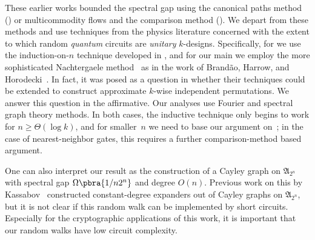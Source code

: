 These earlier works bounded the spectral gap using the canonical paths method (\cite{gowers1996almost,hoory2005simple}) or multicommodity flows and the comparison method (\cite{brodsky2008simple}). We depart from these methods and use techniques from the physics literature concerned with the extent to which random \emph{quantum} circuits are \emph{unitary} $k$-designs. Specifically, for  we use the  induction-on-$n$ technique developed in \cite{haferkamp2021improved}, and for our main  we employ the more sophisticated Nachtergaele method~\cite{nachtergaele1996spectral} as in the work of Brand\~{a}o, Harrow, and Horodecki~\cite{brandao2016local}. In fact, it was posed as a question in \cite{brandao2016local} whether their techniques could be extended to construct approximate $k$-wise independent permutations. We answer this question in the affirmative. Our analyses use Fourier and spectral graph theory methods. In both cases, the inductive technique only begins to work for $n \geq \Theta(\log k)$, and for smaller~$n$ we need to base our argument on~\cite{brodsky2008simple}; in the case of nearest-neighbor gates, this requires a further comparison-method based argument.

One can also interpret our result as the construction of a Cayley graph on $\mathfrak{A}_{2^n}$ with spectral gap $\Omega\pbra{1/n2^n}$ and degree $O(n)$. Previous work on this by Kassabov~\cite{kassabov2007symmetric} constructed constant-degree expanders out of Cayley graphs on $\mathfrak{A}_{2^n}$, but it is not clear if this random walk can be implemented by short circuits. Especially for the cryptographic applications of this work, it is important that our random walks have low circuit complexity. 

